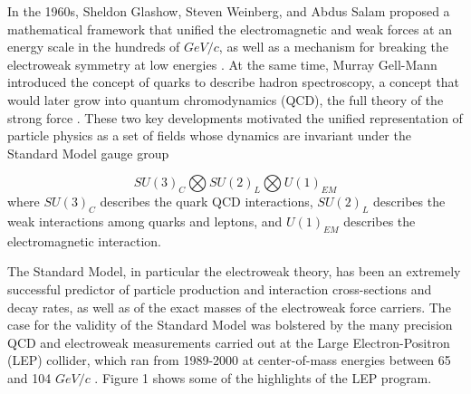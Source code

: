 \documentclass[12pt, letterpaper]{report}
\begin{document}
In the 1960s, Sheldon Glashow, Steven Weinberg, and Abdus Salam proposed a mathematical framework that unified the electromagnetic and weak forces at an energy scale in the hundreds of $GeV/c$, as well as a mechanism for breaking the electroweak symmetry at low energies \cite{Glashow_Weinberg_and_Salam}.  At the same time, Murray Gell-Mann introduced the concept of quarks to describe hadron spectroscopy, a concept that would later grow into quantum chromodynamics (QCD), the full theory of the strong force \cite{Gell-Mann}.  These two key developments motivated the unified representation of particle physics as a set of fields whose dynamics are invariant under the Standard Model gauge group

\begin{equation}
SU(3)_{C} \bigotimes SU(2)_{L} \bigotimes U(1)_{EM}
\end{equation}
%
where $SU(3)_{C}$ describes the quark QCD interactions, $SU(2)_{L}$ describes the weak interactions among quarks and leptons, and $U(1)_{EM}$ describes the electromagnetic interaction.

The Standard Model, in particular the electroweak theory, has been an extremely successful predictor of particle production and interaction cross-sections and decay rates, as well as of the exact masses of the electroweak force carriers.  The case for the validity of the Standard Model was bolstered by the many precision QCD and electroweak measurements carried out at the Large Electron-Positron (LEP) collider, which ran from 1989-2000 at center-of-mass energies between 65 and 104 $GeV/c$ \cite{Drees}.  Figure 1 shows some of the highlights of the LEP program.
\end{document}
